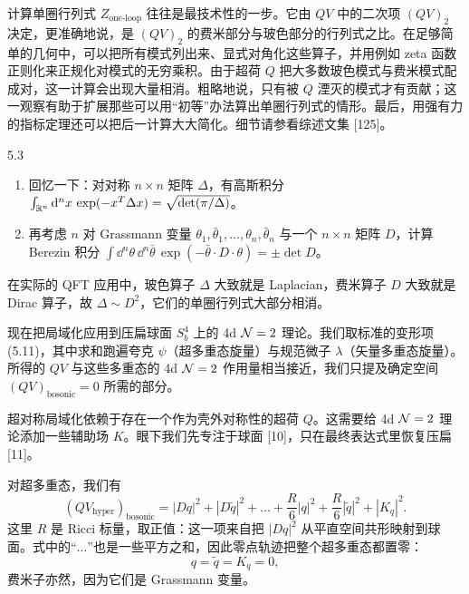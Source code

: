 计算单圈行列式 $Z_{\text{one-loop}}$ 往往是最技术性的一步。它由 $QV$ 中的二次项 $(QV)_2$ 决定，更准确地说，是 $(QV)_2$ 的费米部分与玻色部分的行列式之比。在足够简单的几何中，可以把所有模式列出来、显式对角化这些算子，并用例如 zeta 函数正则化来正规化对模式的无穷乘积。由于超荷 $Q$ 把大多数玻色模式与费米模式配成对，这一计算会出现大量相消。粗略地说，只有被 $Q$ 湮灭的模式才有贡献；这一观察有助于扩展那些可以用“初等”办法算出单圈行列式的情形。最后，用强有力的指标定理还可以把后一计算大大简化。细节请参看综述文集 [125]。

\begin{exercise}{5.3}
\begin{enumerate}[label=\arabic*.,leftmargin=2em,itemsep=1pt,topsep=1pt]
\item 回忆一下：对对称 $n\times n$ 矩阵 $\Delta$，有高斯积分
  $\int_{\mathbb{R}^n}\mathrm{d}^n x\,\exp(-x^T\Delta x)=\sqrt{\det(\pi/\Delta)}$。
\item 再考虑 $n$ 对 Grassmann 变量 $\theta_1,\bar\theta_1,\dots,\theta_n,\bar\theta_n$ 与一个 $n\times n$ 矩阵 $D$，计算 Berezin 积分
  $\int\dd^n\theta\,\dd^n\bar\theta\,\exp(-\bar\theta\cdot D\cdot\theta)=\pm\det D$。
\end{enumerate}
在实际的 QFT 应用中，玻色算子 $\Delta$ 大致就是 Laplacian，费米算子 $D$ 大致就是 Dirac 算子，故 $\Delta\sim D^2$，它们的单圈行列式大部分相消。
\end{exercise}


 现在把局域化应用到压扁球面 $S^4_b$ 上的 4d $\mathcal{N}=2$ 理论。我们取标准的变形项 (5.11)，其中求和跑遍夸克 $\psi$（超多重态旋量）与规范微子 $\lambda$（矢量多重态旋量）。所得的 $QV$ 与这些多重态的 4d $\mathcal{N}=2$ 作用量相当接近，我们只提及确定空间 $(QV)_{\text{bosonic}}=0$ 所需的部分。

超对称局域化依赖于存在一个作为壳外对称性的超荷 $Q$。这需要给 4d $\mathcal{N}=2$ 理论添加一些辅助场 $K$。眼下我们先专注于球面 [10]，只在最终表达式里恢复压扁 [11]。

对超多重态，我们有
\begin{equation}
  (QV_{\text{hyper}})_{\text{bosonic}}
  =|Dq|^2+|D\tilde{q}|^2+\dots+\frac{R}{6}|q|^2+\frac{R}{6}|\tilde{q}|^2+|K_q|^2.
  \tag{5.14}
\end{equation}
这里 $R$ 是 Ricci 标量，取正值：这一项来自把 $|Dq|^2$ 从平直空间共形映射到球面。式中的“$\dots$”也是一些平方之和，因此零点轨迹把整个超多重态都置零：
\begin{equation}
  q=\tilde{q}=K_q=0,
  \tag{5.15}
\end{equation}
费米子亦然，因为它们是 Grassmann 变量。


